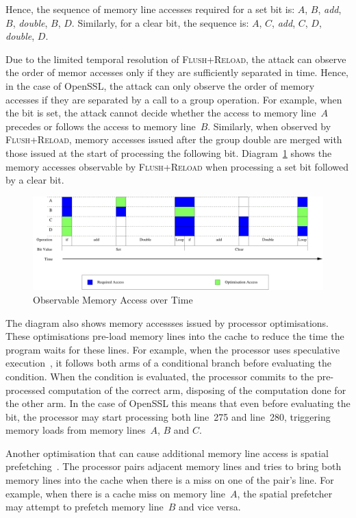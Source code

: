 \documentclass{llncs}
\begin{document}
Hence, the sequence of memory line accesses required for a set bit is: $A$, $B$, \textit{add}, $B$, \textit{double}, $B$, $D$.
Similarly, for a clear bit, the sequence is: $A$, $C$, \textit{add}, $C$, $D$, \textit{double}, $D$.

Due to the limited temporal resolution of \textsc{Flush+Reload}, the attack can observe the order of memor accesses only
if they are sufficiently separated in time.
Hence, in the case of OpenSSL, the attack can only observe the order of memory accesses if they are separated by a call
to a group operation.
For example, when the bit is set, the attack cannot decide whether the access to memory line~$A$ precedes or follows the access
to memory line~$B$.
Similarly, when observed by \textsc{Flush+Reload}, memory accesses issued after the group double are merged with those 
issued at the start of processing the following bit.
Diagram~\ref{dgm:temporal} shows the memory accesses observable by \textsc{Flush+Reload} when processing a set bit followed by
a clear bit.

\begin{figure}[htb]
\centering\includegraphics[width=\columnwidth]{images/temporal}
\caption{Observable Memory Access over Time\label{dgm:temporal}}
\end{figure}

The diagram also shows memory accessses issued by processor optimisations.
These optimisations pre-load memory lines into the cache to reduce the time the program waits for these lines.
For example, when the processor uses speculative execution~\cite{uht95disjoint}, it follows both arms of a conditional
branch before evaluating the condition.
When the condition is evaluated, the processor commits to the pre-processed computation of the correct arm,
disposing of the computation done for the other arm. 
In the case of OpenSSL this means that even before evaluating the bit, 
the processor may start processing both line~275 and line~280, triggering memory loads from memory lines~$A$, $B$ and $C$.

Another optimisation that can cause additional memory line access is spatial prefetching~\cite{intel12optimization}.
The processor pairs adjacent memory lines and tries to bring both memory lines into the cache
when there is a miss on one of the pair's line.
For example, when there is a cache miss on memory line~$A$, the spatial prefetcher may attempt to prefetch memory line~$B$
and vice versa.
\end{document}
